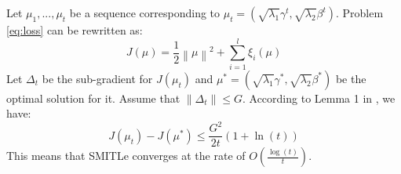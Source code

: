
Let $\mu_1,...,\mu_t$ be a sequence corresponding to $\mu_t=(\sqrt{\lambda_1}\gamma^t,\sqrt{\lambda_2}\beta^t)$. Problem \eqref{eq:loss} can be rewritten as:
\begin{equation*}
J(\mu)=\frac{1}{2}{\left\| \mu  \right\|^2} + \sum\limits_{i = 1}^l {{\xi _i}\left( \mu  \right)} 
\end{equation*}
Let $\Delta_t$ be the sub-gradient for $J(\mu_t)$ and  $\mu^*=(\sqrt{\lambda_1}\gamma^*, \sqrt{\lambda_2}\beta^*)$ be the optimal solution for it. Assume that $\left\| {{\Delta _t}} \right\| \le G$. According to Lemma 1 in \cite{shalev2011pegasos}, we have:
\begin{equation}
J({\mu_t}) - J(\mu^*) \le \frac{{{G^2}}}{{2t}}\left( {1 + \ln \left( t \right)} \right)
\end{equation}
This means that SMITLe converges at the rate of $O(\frac{\log(t)}{t})$.

